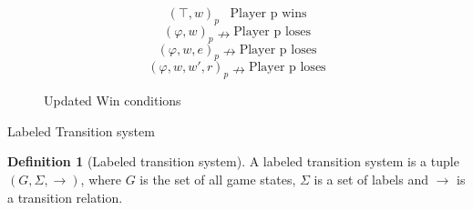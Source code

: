 \documentclass[a4paper,american]{paper}
\theoremstyle{definition}\newtheorem{definition}{Definition}
\begin{document}
\begin{figure}[H]
	\centering
	\begin{equation}
		(\top ,w)_{p}\hspace{10pt}\text{Player p wins}
	\end{equation}
	\begin{equation}
		(\varphi ,w)_{p}\nrightarrow\text{Player p loses}
	\end{equation}
	\begin{equation}
		(\varphi ,w,e)_{p}\nrightarrow\text{Player p loses}
	\end{equation}
	\begin{equation}
		(\varphi ,w,w',r)_{p}\nrightarrow\text{Player p loses}
	\end{equation}
	\caption{Updated Win conditions}
	\label{fig:win_rules}
\end{figure}
Labeled Transition system
\begin{definition}[Labeled transition system]
A labeled transition system is a tuple $(G,\Sigma ,\rightarrow )$, where $G$ is the set of all game states, $\Sigma$ is a set of labels and $\rightarrow$ is a transition relation.
\end{definition}
\end{document}
